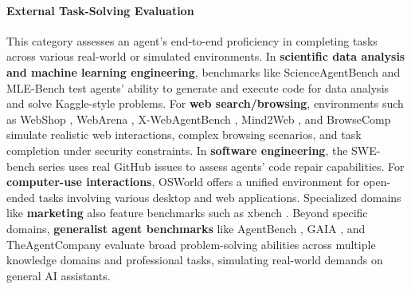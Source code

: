 \paragraph{External Task-Solving Evaluation}
This category assesses an agent's end-to-end proficiency in completing tasks across various real-world or simulated environments. In \textbf{scientific data analysis and machine learning engineering}, benchmarks like ScienceAgentBench \citep{chen2024scienceagentbench} and MLE-Bench \citep{chan2024mle} test agents' ability to generate and execute code for data analysis and solve Kaggle-style problems. For \textbf{web search/browsing}, environments such as WebShop \citep{yao2022webshop}, WebArena \citep{zhou2023webarena}, X-WebAgentBench \citep{wang2025x}, Mind2Web \citep{deng2023mind2web}, and BrowseComp \citep{wei2025browsecomp} simulate realistic web interactions, complex browsing scenarios, and task completion under security constraints. In \textbf{software engineering}, the SWE-bench series \citep{jimenez2023swe, swebenchverified, aleithan2024swe, yang2024swe} uses real GitHub issues to assess agents' code repair capabilities. For \textbf{computer-use interactions}, OSWorld \citep{xie2024osworld} offers a unified environment for open-ended tasks involving various desktop and web applications. Specialized domains like \textbf{marketing} also feature benchmarks such as xbench \citep{chen2025xbench}. Beyond specific domains, \textbf{generalist agent benchmarks} like AgentBench \citep{liu2023agentbench}, GAIA \citep{mialon2023gaia}, and TheAgentCompany \citep{xu2024theagentcompany} evaluate broad problem-solving abilities across multiple knowledge domains and professional tasks, simulating real-world demands on general AI assistants.


